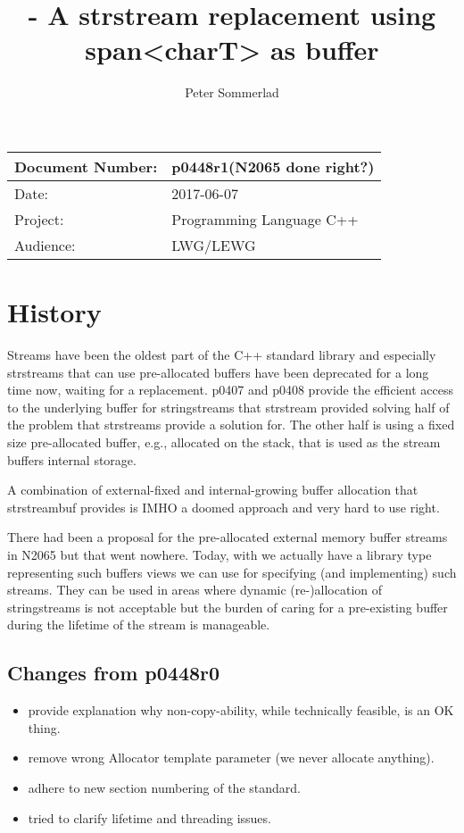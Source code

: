 \documentclass[ebook,11pt,article]{memoir}
\title{\papernumber{} - A strstream replacement using span\textless{}charT\textgreater{} as buffer}
\author{Peter Sommerlad}
\date{\paperdate}                %
\newcommand{\papernumber}{p0448r1}
\newcommand{\paperdate}{2017-06-07}
\begin{document}
\maketitle
\begin{center}
\begin{tabular}[t]{|l|l|}\hline 
Document Number:&  \papernumber \hfill (N2065 done right?)\\\hline
Date: & \paperdate \\\hline
Project: & Programming Language C++\\\hline 
Audience: & LWG/LEWG\\\hline
\end{tabular}
\end{center}
\chapter{History}
Streams have been the oldest part of the C++ standard library and especially strstreams that can use pre-allocated buffers have been deprecated for a long time now, waiting for a replacement. p0407 and p0408 provide the efficient access to the underlying buffer for stringstreams that strstream provided solving half of the problem that strstreams provide a solution for. The other half is using a fixed size pre-allocated buffer, e.g., allocated on the stack, that is used as the stream buffers internal storage.

A combination of external-fixed and internal-growing buffer allocation that strstreambuf provides is IMHO a doomed approach and very hard to use right.

There had been a proposal for the pre-allocated external memory buffer streams in N2065 but that went nowhere. Today, with  we actually have a library type representing such buffers views we can use for specifying (and implementing) such streams. They can be used in areas where dynamic (re-)allocation of stringstreams is not acceptable but the burden of caring for a pre-existing buffer during the lifetime of the stream is manageable. 

\section{Changes from p0448r0}
\begin{itemize}
\item provide explanation why non-copy-ability, while technically feasible, is an OK thing.
\item remove wrong Allocator template parameter (we never allocate anything).
\item adhere to new section numbering of the standard.
\item tried to clarify lifetime and threading issues.
\end{itemize}
\end{document}
